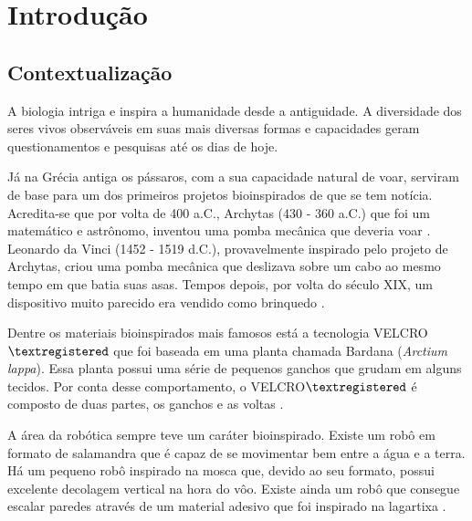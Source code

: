 \documentclass[
	12pt,				%
	openright,			%
	oneside,			%
	a4paper,			%
	english,			%
	brazil				%
	]{abntex2}
\begin{document}
\chapter{Introdução} %
		
		\section{Contextualização}


		A biologia intriga e inspira a humanidade desde a antiguidade. A diversidade dos seres vivos observáveis em suas mais diversas formas e capacidades geram questionamentos e pesquisas até os dias de hoje. 

		Já na Grécia antiga os pássaros, com a sua capacidade natural de voar, serviram de base para um dos primeiros projetos bioinspirados de que se tem notícia. Acredita-se que por volta de 400 a.C., Archytas (430 - 360 a.C.) que foi um matemático e astrônomo, inventou uma pomba mecânica que deveria voar \cite{livingstone2014greece}. Leonardo da Vinci (1452 - 1519 d.C.), provavelmente inspirado pelo projeto de Archytas, criou uma pomba mecânica que deslizava sobre um cabo ao mesmo tempo em que batia suas asas. Tempos depois, por volta do século XIX, um dispositivo muito parecido era vendido como brinquedo \cite{rosheim2006leonardo}.

		Dentre os materiais bioinspirados mais famosos está a tecnologia VELCRO${\textregistered}$ que foi baseada em uma planta chamada Bardana (\textit{Arctium lappa}). Essa planta possui uma série de pequenos ganchos que grudam em alguns tecidos. Por conta desse comportamento, o VELCRO${\textregistered}$ é composto de duas partes, os ganchos e as voltas \cite{velcro2019about}. 
		
		A área da robótica sempre teve um caráter bioinspirado. Existe um robô em formato de salamandra que é capaz de se movimentar bem entre a água e a terra. Há um pequeno robô inspirado na mosca que, devido ao seu formato, possui excelente decolagem vertical na hora do vôo. Existe ainda um robô que consegue escalar paredes através de um material adesivo que foi inspirado na lagartixa \cite{pfeifer2007biorobot}. 
\end{document}
